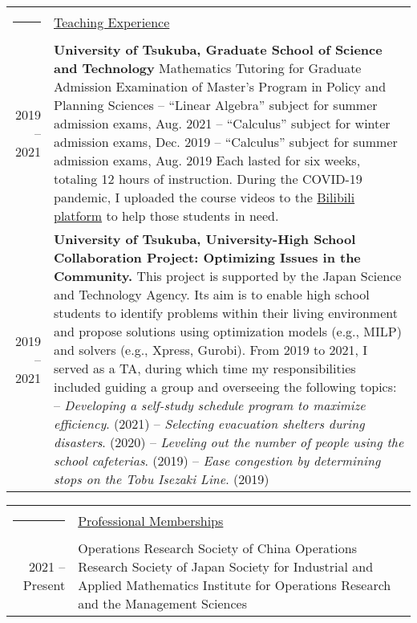 \documentclass[11pt]{article}
\newcommand{\headingfont}{\LARGE \MakeUppercase }
\newenvironment{SectionTable}[1]{
	\renewcommand*{\arraystretch}{1.0}
	\setlength{\tabcolsep}{10pt}
	\begin{longtable}{Rp{5.7in}} 
		\rule{2.5cm}{4pt} 
		& \underline{#1} \\ %
	}
	{
	\end{longtable}\vspace{-.3cm}
}
\begin{document}
\begin{SectionTable}{\headingfont Teaching Experience}
	2019 -- 2021 &
	\textbf{University of Tsukuba, Graduate School of Science and Technology} \newline
	Mathematics Tutoring for Graduate Admission Examination of Master's Program in Policy and Planning Sciences \newline
	-- ``Linear Algebra'' subject for summer admission exams, Aug. 2021  \newline
	-- ``Calculus'' subject for winter admission exams, Dec. 2019 \newline
	-- ``Calculus'' subject for summer admission exams, Aug. 2019 \newline
	Each lasted for six weeks, totaling 12 hours of instruction. During the COVID-19 pandemic, I uploaded the course videos to the \href{https://space.bilibili.com/16115578}{Bilibili platform} to help those students in need. \\
	 
	 2019 -- 2021 &
	 \textbf{University of Tsukuba, University-High School Collaboration Project: Optimizing Issues in the Community.} \newline	
	This project is supported by the Japan Science and Technology Agency. Its aim is to enable high school students to identify problems within their living environment and propose solutions using optimization models (e.g., MILP) and solvers (e.g., Xpress, Gurobi). \newline	
	From 2019 to 2021, I served as a TA, during which time my responsibilities included guiding a group and overseeing the following topics: \newline
	--  \textit{Developing a self-study schedule program to maximize efficiency}. (2021) \newline
	--  \textit{Selecting evacuation shelters during disasters}. (2020) \newline 
	--  \textit{Leveling out the number of people using the school cafeterias}. (2019) \newline
	--  \textit{Ease congestion by determining stops on the Tobu Isezaki Line}. (2019) 
\end{SectionTable}


\begin{SectionTable}{\headingfont Professional Memberships}
2021 -- Present & 
Operations Research Society of China \newline
Operations Research Society of Japan \newline
Society for Industrial and Applied Mathematics \newline
Institute for Operations Research and the Management Sciences \\
\end{SectionTable}
\end{document}

